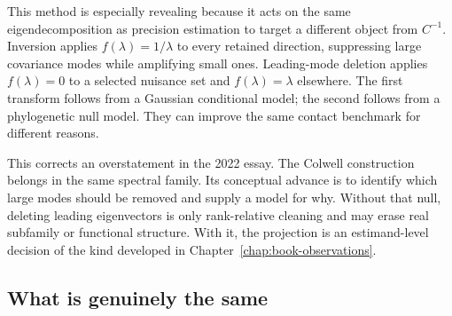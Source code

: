This method is especially revealing because it acts on the same eigendecomposition as precision
estimation to target a different object from $C^{-1}$.  Inversion applies $f(\lambda)=1/\lambda$ to every
retained direction, suppressing large covariance modes while amplifying small ones.  Leading-mode
deletion applies $f(\lambda)=0$ to a selected nuisance set and $f(\lambda)=\lambda$ elsewhere.  The
first transform follows from a Gaussian conditional model; the second follows from a phylogenetic
null model.  They can improve the same contact benchmark for different reasons.

This corrects an overstatement in the 2022 essay.  The Colwell construction belongs in the same
spectral family.  Its conceptual advance is to identify which large modes should be removed and
supply a model for
why.  Without that null, deleting leading eigenvectors is only rank-relative cleaning and may
erase real subfamily or functional structure.  With it, the projection is an estimand-level
decision of the kind developed in Chapter~\ref{chap:book-observations}.

\subsection{What is genuinely the same}

